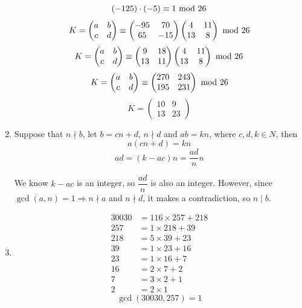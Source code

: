 \documentclass{article}
\begin{document}
\begin{enumerate}
$$(-125)\cdot(-5)\equiv 1{\rm\ mod\ }26$$
$$
K=\begin{pmatrix}a&b\\c&d\end{pmatrix}\equiv
\begin{pmatrix}-95&70\\65&-15\end{pmatrix}
\begin{pmatrix}4&11\\13&8\end{pmatrix}
{\rm\ mod\ }26
$$
$$
K=\begin{pmatrix}a&b\\c&d\end{pmatrix}\equiv
\begin{pmatrix}9&18\\13&11\end{pmatrix}
\begin{pmatrix}4&11\\13&8\end{pmatrix}
{\rm\ mod\ }26
$$
$$
K=\begin{pmatrix}a&b\\c&d\end{pmatrix}\equiv
\begin{pmatrix}270&243\\195&231\end{pmatrix}
{\rm\ mod\ }26
$$
$$
K=\begin{pmatrix}10&9\\13&23\end{pmatrix}
$$

\item
Suppose that $n\nmid b$, let $b=cn+d$, $n\nmid d$ and $ab=kn$, where $c,d,k\in N$, then
$$a(cn+d)=kn$$
$$ad=(k-ac)n=\frac{ad}{n}n$$

We know $k-ac$ is an integer, so $\dfrac{ad}{n}$ is also an integer. However, since $\gcd(a,n)=1\Rightarrow n\nmid a$ and $n\nmid d$, it makes a contradiction, so $n\mid b$.

\item
\begin{align*}
30030&=116\times257+218\\
257&=1\times218+39\\
218&=5\times39+23\\
39&=1\times23+16\\
23&=1\times16+7\\
16&=2\times7+2\\
7&=3\times2+1\\
2&=2\times1
\end{align*}
$$\gcd(30030,257)=1$$


\end{enumerate}
\end{document}
